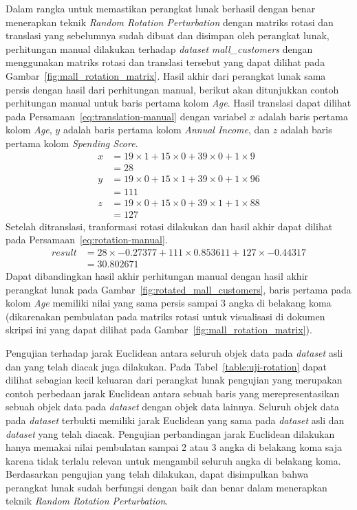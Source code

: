 Dalam rangka untuk memastikan perangkat lunak berhasil dengan benar menerapkan teknik \textit{Random Rotation Perturbation} dengan matriks rotasi dan translasi yang sebelumnya sudah dibuat dan disimpan oleh perangkat lunak, perhitungan manual dilakukan terhadap \textit{dataset} \textit{mall\_customers} dengan menggunakan matriks rotasi dan translasi tersebut yang dapat dilihat pada Gambar~\ref{fig:mall_rotation_matrix}. Hasil akhir dari perangkat lunak sama persis dengan hasil dari perhitungan manual, berikut akan ditunjukkan contoh perhitungan manual untuk baris pertama kolom \textit{Age}. Hasil translasi dapat dilihat pada Persamaan~\ref{eq:translation-manual} dengan variabel \(x\) adalah baris pertama kolom \textit{Age}, \(y\) adalah baris pertama kolom \textit{Annual Income}, dan \(z\) adalah baris pertama kolom \textit{Spending Score}. 
\begin{align}
	x &= 19\times1+15\times0+39\times0+1\times9 \label{eq:translation-manual}\\
	&= 28 \nonumber\\
	y &= 19\times0+15\times1+39\times0+1\times96 \nonumber\\
	&= 111 \nonumber\\
	z &= 19\times0+15\times0+39\times1+1\times88 \nonumber\\
	&= 127 \nonumber
\end{align}
Setelah ditranslasi, tranformasi rotasi dilakukan dan hasil akhir dapat dilihat pada Persamaan~\ref{eq:rotation-manual}. 
\begin{align}
	result &= 28\times-0.27377 + 111\times0.853611 + 127\times-0.44317 \label{eq:rotation-manual}\\
	&= 30.802671 \nonumber
\end{align}
Dapat dibandingkan hasil akhir perhitungan manual dengan hasil akhir perangkat lunak pada Gambar~\ref{fig:rotated_mall_customers}, baris pertama pada kolom \textit{Age} memiliki nilai yang sama persis sampai 3 angka di belakang koma (dikarenakan pembulatan pada matriks rotasi untuk visualisasi di dokumen skripsi ini yang dapat dilihat pada Gambar~\ref{fig:mall_rotation_matrix}).

Pengujian terhadap jarak Euclidean antara seluruh objek data pada \textit{dataset} asli dan yang telah diacak juga dilakukan. Pada Tabel~\ref{table:uji-rotation} dapat dilihat sebagian kecil keluaran dari perangkat lunak pengujian yang merupakan contoh perbedaan jarak Euclidean antara sebuah baris yang merepresentasikan sebuah objek data pada \textit{dataset} dengan objek data lainnya. Seluruh objek data pada \textit{dataset} terbukti memiliki jarak Euclidean yang sama pada \textit{dataset} asli dan \textit{dataset} yang telah diacak. Pengujian perbandingan jarak Euclidean dilakukan hanya memakai nilai pembulatan sampai 2 atau 3 angka di belakang koma saja karena tidak terlalu relevan untuk mengambil seluruh angka di belakang koma. Berdasarkan pengujian yang telah dilakukan, dapat disimpulkan bahwa perangkat lunak sudah berfungsi dengan baik dan benar dalam menerapkan teknik \textit{Random Rotation Perturbation}.

